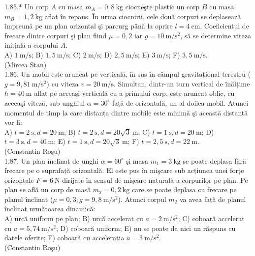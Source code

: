 1.85.* Un corp $A$ cu masa $m_{A}=0,8 \mathrm{~kg}$ ciocneşte plastic un corp $B$ cu masa $m_{B}=1,2 \mathrm{~kg}$ aflat în repaus. În urma ciocnirii, cele două corpuri se deplasează împreună pe un plan orizontal şi parcurg până la oprire $l=4 \mathrm{~cm}$. Coeficientul de frecare dintre corpuri şi plan fiind $\mu=0,2$ iar $g=10 \mathrm{~m} / \mathrm{s}^{2}$, să se determine viteza initịală a corpului $A$.\\ A) $1 \mathrm{~m} / \mathrm{s}$; B) $1,5 \mathrm{~m} / \mathrm{s}$; C) $2 \mathrm{~m} / \mathrm{s}$; D) $2,5 \mathrm{~m} / \mathrm{s}$; E) $3 \mathrm{~m} / \mathrm{s}$; F) $3,5 \mathrm{~m} / \mathrm{s}$.\\ (Mircea Stan)\\

1.86. Un mobil este aruncat pe verticală, în sus în câmpul gravitațional terestru ($g=9,81 \mathrm{~m} / \mathrm{s}^{2}$) cu viteza $v=20 \mathrm{~m} / \mathrm{s}$. Simultan, dintr-un turn vertical de înălțime $h=40 \mathrm{~m}$ aflat pe aceeaşi verticală cu a primului corp, este aruncat oblic, cu aceeaşi viteză, sub unghiul $\alpha=30^{\circ}$ față de orizontală, un al doilea mobil. Atunci momentul de timp la care distanța dintre mobile este minimă şi această distanță vor fi:\\ A) $t=2 \mathrm{~s}, d=20 \mathrm{~m}$; B) $t=2 \mathrm{~s}, d=20 \sqrt{3} \mathrm{~m}$; C) $t=1 \mathrm{~s}, d=20 \mathrm{~m}$; D) $t=3 \mathrm{~s}, d=40 \mathrm{~m}$; E) $t=1 \mathrm{~s}, d=20 \sqrt{3} \mathrm{~m}$; F) $t=2,5 \mathrm{~s}, d=22 \mathrm{~m}$.\\ (Constantin Roşu)\\

1.87. Un plan înclinat de unghi $\alpha=60^{\circ}$ şi masa $m_{1}=3 \mathrm{~kg}$ se poate deplasa fără frecare pe o suprafață orizontală. El este pus în mişcare sub acțiunea unei forțe orizontale $F=6 \mathrm{~N}$ dirijate în sensul de mişcare naturală a corpurilor pe plan. Pe plan se află un corp de masă $m_{2}=0,2 \mathrm{~kg}$ care se poate deplasa cu frecare pe planul înclinat ($\mu=0,3 ; g=9,8 \mathrm{~m} / \mathrm{s}^{2}$). Atunci corpul $m_{2}$ va avea față de planul înclinat următoarea dinamică:\\ A) urcă uniform pe plan; B) urcă accelerat cu $a=2 \mathrm{~m} / \mathrm{s}^{2}$; C) coboară accelerat cu $a=5,74 \mathrm{~m} / \mathrm{s}^{2}$; D) coboară uniform; E) nu se poate da nici un răspuns cu datele oferite; F) coboară cu accelerația $a=3 \mathrm{~m} / \mathrm{s}^{2}$.\\ (Constantin Roşu)\\

